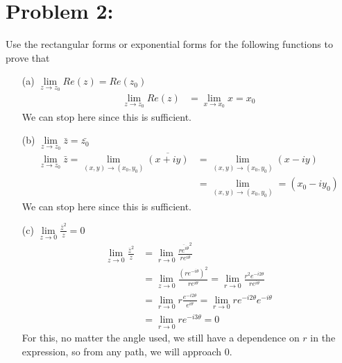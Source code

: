 \documentclass{article}
\begin{document}
\section*{Problem 2: }
Use the rectangular forms or exponential forms for the following functions to prove that
\begin{enumerate}
\item[(a)]  $\lim\limits_{z\to z_0} Re(z) = Re(z_0)$
  \begin{align*}
    \lim\limits_{z\to z_0} Re(z) &= \boxed{\lim\limits_{x\to x_0} x = x_0}
  \end{align*}
  We can stop here since this is sufficient.
  
\item[(b)] $\lim\limits_{z\to z_0} \bar{z} = \bar{z_0} $
  \begin{align*}
    \lim\limits_{z\to z_0} \bar{z} = \lim\limits_{(x,y)\to (x_0,y_0)} \overline{(x+iy)} &= \lim\limits_{(x,y)\to (x_0,y_0)}(x-iy) \\
    &=\boxed{\lim\limits_{(x,y)\to (x_0,y_0)} = (x_0-iy_0)}
  \end{align*}
  We can stop here since this is sufficient.
\item[(c)] $\lim\limits_{z\to 0} \frac{\bar{z}^2}{z} = 0$
  \begin{align*}
    \lim\limits_{z\to 0} \frac{\bar{z}^2}{z} &= \lim\limits_{r\to 0} \frac{\overline{re^{i\theta}}^2}{re^{i\theta}}\\
                                             &= \lim\limits_{z\to 0} \frac{(re^{-i\theta})^2}{re^{i\theta}} = \lim\limits_{r\to 0}\frac{r^2e^{-i2\theta}}{re^{i\theta}}\\
                                             &= \lim\limits_{r\to 0}r\frac{e^{-i2\theta}}{e^{i\theta}} = \lim\limits_{r\to 0}re^{-i2\theta}e^{-i\theta} \\
    &= \boxed{\lim\limits_{r\to 0}re^{-i3\theta} = 0}
  \end{align*}
  For this, no matter the angle used, we still have a dependence on $r$ in the expression, so from any path, we will approach $0$.
\end{enumerate}

\end{document}
